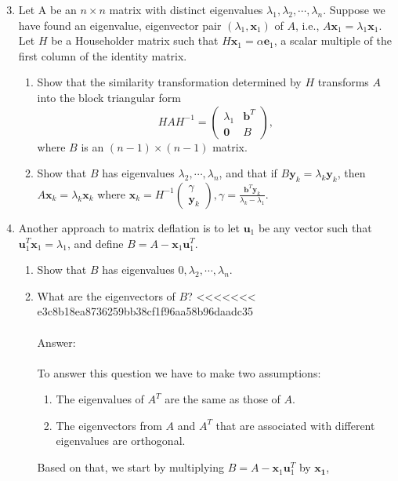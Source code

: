 \documentclass{article}
\renewcommand{\vec}[1]{\mathbf{#1}}
\begin{document}
\begin{enumerate}
\setcounter{enumi}{2}
\item Let A be an $n \times n$ matrix with distinct eigenvalues $\lambda_1, \lambda_2, \cdots, \lambda_n$.
Suppose we have found an eigenvalue, eigenvector pair $(\lambda_1,\vec{x}_1)$ of $A$, i.e., $A \vec{x}_1 = \lambda_1 \vec{x}_1$.  Let $H$ be a Householder matrix such that $H\vec{x}_1 =
\alpha \vec{e}_1$, a scalar multiple of the first column of the identity  matrix.  
\begin{enumerate}
\item Show that the similarity transformation determined by $H$ transforms $A$ into the block triangular form 
$$
H A H^{-1} = \begin{pmatrix} \lambda_1 & \vec{b}^T \\ \vec{0} & B \end{pmatrix},
$$
where $B$ is an $(n-1) \times (n-1)$ matrix.
\item Show that $B$ has eigenvalues $\lambda_2, \cdots, \lambda_n$, and that if $B\vec{y}_k = \lambda_k \vec{y}_k$, then $A \vec{x}_k = \lambda_k \vec{x}_k$ where $\vec{x}_k =
  H^{-1} \begin{pmatrix} \gamma \\ \vec{y}_k \end{pmatrix}, \gamma = \frac{\vec{b}^T\vec{y}_k}{\lambda_k-\lambda_1}.$
\end{enumerate}
\item Another approach to matrix deflation is to let $\vec{u}_1$ be any vector such that $\vec{u}_1^T\vec{x}_1 = \lambda_1$, and define $B = A - \vec{x}_1\vec{u}_1^T$.
\begin{enumerate}
\item Show that $B$ has eigenvalues $0, \lambda_2, \cdots, \lambda_n$.
\item What are the eigenvectors of $B$?
<<<<<<< e3c8b18ea8736259bb38cf1f96aa58b96daadc35
\\
\\
Answer:\\
\\
To answer this question we have to make two assumptions:
\begin{enumerate}
 \item The eigenvalues of $A^T$ are the same as those of $A$.
 \item The eigenvectors from $A$ and $A^T$ that are associated with different eigenvalues are orthogonal.
\end{enumerate}
Based on that, we start by multiplying $B = A - \vec{x}_1\vec{u}_1^T$ by $\vec{x_1}$,


\end{enumerate}
\end{enumerate}
\end{document}
